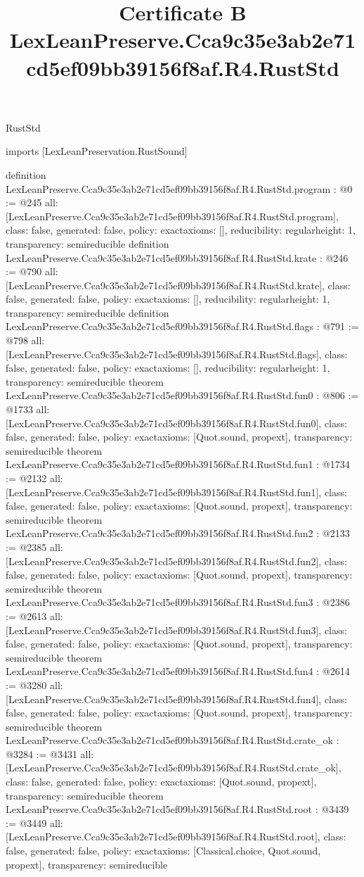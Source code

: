 \begin{lexlean}{RustStd}
\title{Certificate B LexLeanPreserve.Cca9c35e3ab2e71cd5ef09bb39156f8af.R4.RustStd}
\begin{coremodule}
imports [LexLeanPreservation.RustSound]

definition LexLeanPreserve.Cca9c35e3ab2e71cd5ef09bb39156f8af.R4.RustStd.program : @0 := @245 {
  all: [LexLeanPreserve.Cca9c35e3ab2e71cd5ef09bb39156f8af.R4.RustStd.program],
  class: false,
  generated: false,
  policy: exact{axioms: []},
  reducibility: regular{height: 1},
  transparency: semireducible
}
definition LexLeanPreserve.Cca9c35e3ab2e71cd5ef09bb39156f8af.R4.RustStd.krate : @246 := @790 {
  all: [LexLeanPreserve.Cca9c35e3ab2e71cd5ef09bb39156f8af.R4.RustStd.krate],
  class: false,
  generated: false,
  policy: exact{axioms: []},
  reducibility: regular{height: 1},
  transparency: semireducible
}
definition LexLeanPreserve.Cca9c35e3ab2e71cd5ef09bb39156f8af.R4.RustStd.flags : @791 := @798 {
  all: [LexLeanPreserve.Cca9c35e3ab2e71cd5ef09bb39156f8af.R4.RustStd.flags],
  class: false,
  generated: false,
  policy: exact{axioms: []},
  reducibility: regular{height: 1},
  transparency: semireducible
}
theorem LexLeanPreserve.Cca9c35e3ab2e71cd5ef09bb39156f8af.R4.RustStd.fun0 : @806 := @1733 {
  all: [LexLeanPreserve.Cca9c35e3ab2e71cd5ef09bb39156f8af.R4.RustStd.fun0],
  class: false,
  generated: false,
  policy: exact{axioms: [Quot.sound, propext]},
  transparency: semireducible
}
theorem LexLeanPreserve.Cca9c35e3ab2e71cd5ef09bb39156f8af.R4.RustStd.fun1 : @1734 := @2132 {
  all: [LexLeanPreserve.Cca9c35e3ab2e71cd5ef09bb39156f8af.R4.RustStd.fun1],
  class: false,
  generated: false,
  policy: exact{axioms: [Quot.sound, propext]},
  transparency: semireducible
}
theorem LexLeanPreserve.Cca9c35e3ab2e71cd5ef09bb39156f8af.R4.RustStd.fun2 : @2133 := @2385 {
  all: [LexLeanPreserve.Cca9c35e3ab2e71cd5ef09bb39156f8af.R4.RustStd.fun2],
  class: false,
  generated: false,
  policy: exact{axioms: [Quot.sound, propext]},
  transparency: semireducible
}
theorem LexLeanPreserve.Cca9c35e3ab2e71cd5ef09bb39156f8af.R4.RustStd.fun3 : @2386 := @2613 {
  all: [LexLeanPreserve.Cca9c35e3ab2e71cd5ef09bb39156f8af.R4.RustStd.fun3],
  class: false,
  generated: false,
  policy: exact{axioms: [Quot.sound, propext]},
  transparency: semireducible
}
theorem LexLeanPreserve.Cca9c35e3ab2e71cd5ef09bb39156f8af.R4.RustStd.fun4 : @2614 := @3280 {
  all: [LexLeanPreserve.Cca9c35e3ab2e71cd5ef09bb39156f8af.R4.RustStd.fun4],
  class: false,
  generated: false,
  policy: exact{axioms: [Quot.sound, propext]},
  transparency: semireducible
}
theorem LexLeanPreserve.Cca9c35e3ab2e71cd5ef09bb39156f8af.R4.RustStd.crate_ok : @3284 := @3431 {
  all: [LexLeanPreserve.Cca9c35e3ab2e71cd5ef09bb39156f8af.R4.RustStd.crate_ok],
  class: false,
  generated: false,
  policy: exact{axioms: [Quot.sound, propext]},
  transparency: semireducible
}
theorem LexLeanPreserve.Cca9c35e3ab2e71cd5ef09bb39156f8af.R4.RustStd.root : @3439 := @3449 {
  all: [LexLeanPreserve.Cca9c35e3ab2e71cd5ef09bb39156f8af.R4.RustStd.root],
  class: false,
  generated: false,
  policy: exact{axioms: [Classical.choice, Quot.sound, propext]},
  transparency: semireducible
}


\end{coremodule}
\end{lexlean}
